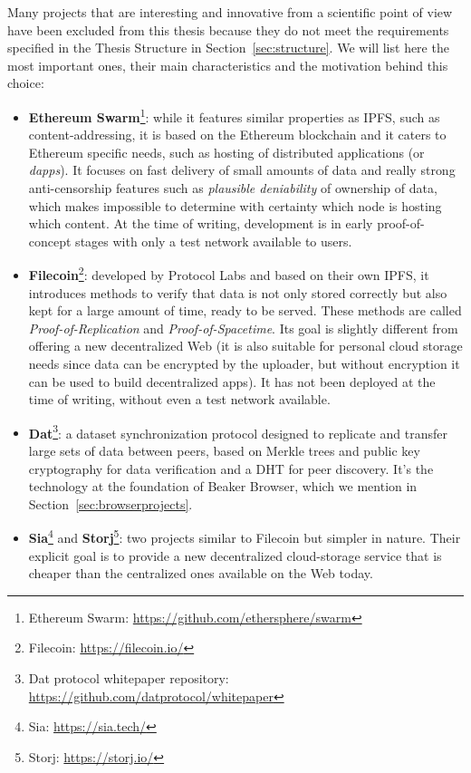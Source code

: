 \documentclass[mscthesis]{usiinfthesis}
\begin{document}
Many projects that are interesting and innovative from a scientific point of view have been excluded from this thesis because they do not meet the requirements specified in the Thesis Structure in Section~\ref{sec:structure}. We will list here the most important ones, their main characteristics and the motivation behind this choice:
\begin{itemize}
	\item \textbf{Ethereum Swarm}\footnote{Ethereum Swarm: \url{https://github.com/ethersphere/swarm}}: while it features similar properties as IPFS, such as content-addressing, it is based on the Ethereum blockchain and it caters to Ethereum specific needs, such as hosting of distributed applications (or \textit{dapps}). It focuses on fast delivery of small amounts of data and really strong anti-censorship features such as \textit{plausible deniability} of ownership of data, which makes impossible to determine with certainty which node is hosting which content. At the time of writing, development is in early proof-of-concept stages with only a test network available to users.
	\item \textbf{Filecoin}\footnote{Filecoin: \url{https://filecoin.io/}}: developed by Protocol Labs and based on their own IPFS, it introduces methods to verify that data is not only stored correctly but also kept for a large amount of time, ready to be served. These methods are called \textit{Proof-of-Replication} and \textit{Proof-of-Spacetime}. Its goal is slightly different from offering a new decentralized Web (it is also suitable for personal cloud storage needs since data can be encrypted by the uploader, but without encryption it can be used to build decentralized apps). It has not been deployed at the time of writing, without even a test network available.
	\item \textbf{Dat}\footnote{Dat protocol whitepaper repository: \url{https://github.com/datprotocol/whitepaper}}: a dataset synchronization protocol designed to replicate and transfer large sets of data between peers, based on Merkle trees and public key cryptography for data verification and a DHT for peer discovery. It's the technology at the foundation of Beaker Browser, which we mention in Section~\ref{sec:browserprojects}.
	\item \textbf{Sia}\footnote{Sia: \url{https://sia.tech/}} and \textbf{Storj}\footnote{Storj: \url{https://storj.io/}}: two projects similar to Filecoin but simpler in nature. Their explicit goal is to provide a new decentralized cloud-storage service that is cheaper than the centralized ones available on the Web today.
\end{itemize}
\end{document}
